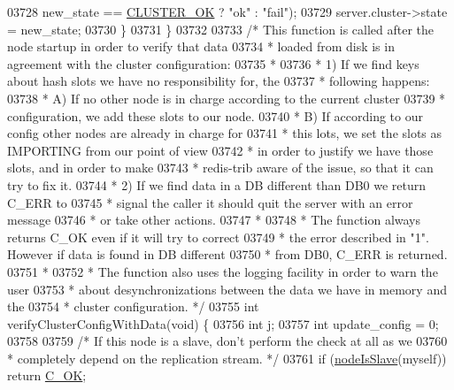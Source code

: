 \begin{DoxyCode}
{{{{{{{{{{{{{{{{{{{{{{{{{{{{{{{{{{{{{{{{{{{{{{{{{{{{{{{{{{{{{{03728             new\_state == \hyperlink{cluster_8h_adbda03922c45cac3cfc98a5c34a9d2d2}{CLUSTER\_OK} ? \textcolor{stringliteral}{"ok"} : \textcolor{stringliteral}{"fail"});
03729         server.cluster->state = new\_state;
03730     \}
03731 \}
03732 
03733 \textcolor{comment}{/* This function is called after the node startup in order to verify that data}
03734 \textcolor{comment}{ * loaded from disk is in agreement with the cluster configuration:}
03735 \textcolor{comment}{ *}
03736 \textcolor{comment}{ * 1) If we find keys about hash slots we have no responsibility for, the}
03737 \textcolor{comment}{ *    following happens:}
03738 \textcolor{comment}{ *    A) If no other node is in charge according to the current cluster}
03739 \textcolor{comment}{ *       configuration, we add these slots to our node.}
03740 \textcolor{comment}{ *    B) If according to our config other nodes are already in charge for}
03741 \textcolor{comment}{ *       this lots, we set the slots as IMPORTING from our point of view}
03742 \textcolor{comment}{ *       in order to justify we have those slots, and in order to make}
03743 \textcolor{comment}{ *       redis-trib aware of the issue, so that it can try to fix it.}
03744 \textcolor{comment}{ * 2) If we find data in a DB different than DB0 we return C\_ERR to}
03745 \textcolor{comment}{ *    signal the caller it should quit the server with an error message}
03746 \textcolor{comment}{ *    or take other actions.}
03747 \textcolor{comment}{ *}
03748 \textcolor{comment}{ * The function always returns C\_OK even if it will try to correct}
03749 \textcolor{comment}{ * the error described in "1". However if data is found in DB different}
03750 \textcolor{comment}{ * from DB0, C\_ERR is returned.}
03751 \textcolor{comment}{ *}
03752 \textcolor{comment}{ * The function also uses the logging facility in order to warn the user}
03753 \textcolor{comment}{ * about desynchronizations between the data we have in memory and the}
03754 \textcolor{comment}{ * cluster configuration. */}
03755 \textcolor{keywordtype}{int} verifyClusterConfigWithData(\textcolor{keywordtype}{void}) \{
03756     \textcolor{keywordtype}{int} j;
03757     \textcolor{keywordtype}{int} update\_config = 0;
03758 
03759     \textcolor{comment}{/* If this node is a slave, don't perform the check at all as we}
03760 \textcolor{comment}{     * completely depend on the replication stream. */}
03761     \textcolor{keywordflow}{if} (\hyperlink{cluster_8h_a3c99881f6892130c902b42b1f84a0e11}{nodeIsSlave}(myself)) \textcolor{keywordflow}{return} \hyperlink{server_8h_a303769ef1065076e68731584e758d3e1}{C\_OK};
}}}}}}}}}}}}}}}}}}}}}}}}}}}}}}}}}}}}}}}}}}}}}}}}}}}}}}}}}}}}}}
\end{DoxyCode}
